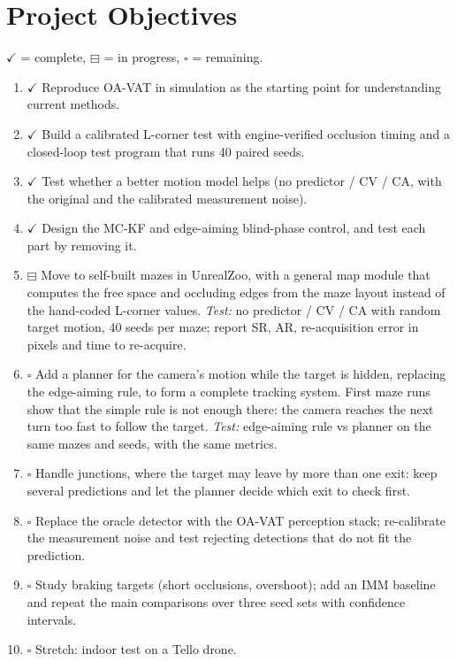 \documentclass[12pt,a4paper]{article}
\begin{document}
\section{Project Objectives}
$\checkmark$ = complete, $\boxminus$ = in progress, $\square$ = remaining.

\begin{enumerate}
  \item $\checkmark$ Reproduce OA-VAT \cite{r3} in simulation as the starting point for understanding current methods.
  \item $\checkmark$ Build a calibrated L-corner test with engine-verified occlusion timing and a closed-loop test program that runs 40 paired seeds.
  \item $\checkmark$ Test whether a better motion model helps (no predictor / CV / CA, with the original and the calibrated measurement noise).
  \item $\checkmark$ Design the MC-KF and edge-aiming blind-phase control, and test each part by removing it.
  \item $\boxminus$ Move to self-built mazes in UnrealZoo, with a general map module that computes the free space and occluding edges from the maze layout instead of the hand-coded L-corner values. \emph{Test:} no predictor / CV / CA with random target motion, 40 seeds per maze; report SR, AR, re-acquisition error in pixels and time to re-acquire.
  \item $\square$ Add a planner for the camera's motion while the target is hidden, replacing the edge-aiming rule, to form a complete tracking system. First maze runs show that the simple rule is not enough there: the camera reaches the next turn too fast to follow the target. \emph{Test:} edge-aiming rule vs planner on the same mazes and seeds, with the same metrics.
  \item $\square$ Handle junctions, where the target may leave by more than one exit: keep several predictions and let the planner decide which exit to check first.
  \item $\square$ Replace the oracle detector with the OA-VAT perception stack; re-calibrate the measurement noise and test rejecting detections that do not fit the prediction.
  \item $\square$ Study braking targets (short occlusions, overshoot); add an IMM baseline and repeat the main comparisons over three seed sets with confidence intervals.
  \item $\square$ Stretch: indoor test on a Tello drone.
\end{enumerate}
\end{document}
